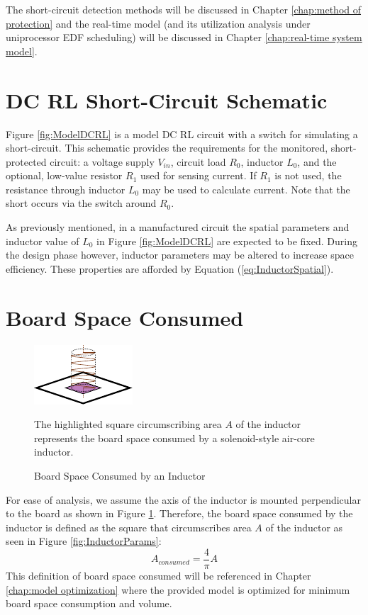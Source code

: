 \documentclass[11pt,oneside]{report}
\begin{document}
    The short-circuit detection methods will be discussed in Chapter \ref{chap:method of protection} and the real-time model (and its utilization analysis under uniprocessor EDF scheduling) will be discussed in Chapter \ref{chap:real-time system model}.
    
    \section{DC RL Short-Circuit Schematic}
    Figure \ref{fig:ModelDCRL} is a model DC RL circuit with a switch for simulating a short-circuit. This schematic provides the requirements for the monitored, short-protected circuit: a voltage supply $V_{in}$, circuit load $R_{0}$, inductor $L_{0}$, and the optional, low-value resistor $R_{1}$ used for sensing current. If $R_{1}$ is not used, the resistance through inductor $L_{0}$ may be used to calculate current. Note that the short occurs via the switch around $R_{0}$.
    
    As previously mentioned, in a manufactured circuit the spatial parameters and inductor value of $L_0$ in Figure \ref{fig:ModelDCRL} are expected to be fixed. During the design phase however, inductor parameters may be altered to increase space efficiency. These properties are afforded by Equation (\ref{eq:InductorSpatial}).
    
    \section{Board Space Consumed}
    \begin{figure}
    	\centering
        \includegraphics[scale=2.0]{img/Inductor_Perpendicular_Mount.pdf}
        \caption{Board Space Consumed by an Inductor} The highlighted square circumscribing area $A$ of the inductor represents the board space consumed by a solenoid-style air-core inductor.
        \label{fig:BoardSpaceConsumed}
    \end{figure}
    For ease of analysis, we assume the axis of the inductor is mounted perpendicular to the board as shown in Figure \ref{fig:BoardSpaceConsumed}. Therefore, the board space consumed by the inductor is defined as the square that circumscribes area $A$ of the inductor as seen in Figure \ref{fig:InductorParams}:
    \begin{equation}\label{eq:AreaConsumed}
    A_{consumed} = \frac{4}{\pi}A
    \end{equation}
    This definition of board space consumed will be referenced in Chapter \ref{chap:model optimization} where the provided model is optimized for minimum board space consumption and volume.
\end{document}
